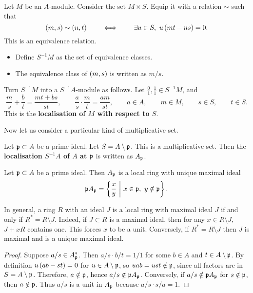 \begin{definition}
Let $ M $ be an $ A $-module. Consider the set $ M \times S $. Equip it with a relation $ \sim $ such that
$$ \br{m, s} \sim \br{n, t} \qquad \iff \qquad \exists u \in S, \ u\br{mt - ns} = 0. $$
This is an equivalence relation.
\begin{itemize}
\item Define $ S^{-1}M $ as the set of equivalence classes.
\item The equivalence class of $ \br{m, s} $ is written as $ m / s $.
\end{itemize}
Turn $ S^{-1}M $ into a $ S^{-1}A $-module as follows. Let $ \tfrac{0}{1}, \tfrac{1}{1} \in S^{-1}M $, and
$$ \dfrac{m}{s} + \dfrac{b}{t} = \dfrac{mt + bs}{st}, \qquad \dfrac{a}{s} \cdot \dfrac{m}{t} = \dfrac{am}{st}, \qquad a \in A, \qquad m \in M, \qquad s \in S, \qquad t \in S. $$
This is the \textbf{localisation of $ M $ with respect to $ S $}.
\end{definition}

\pagebreak

Now let us consider a particular kind of multiplicative set.

\begin{definition}
Let $ \mathfrak{p} \subset A $ be a prime ideal. Let $ S = A \setminus \mathfrak{p} $. This is a multiplicative set. Then the \textbf{localisation $ S^{-1}A $ of $ A $ at $ \mathfrak{p} $} is written as $ A_{\mathfrak{p}} $.
\end{definition}

\begin{theorem}
Let $ \mathfrak{p} \subset A $ be a prime ideal. Then $ A_{\mathfrak{p}} $ is a local ring with unique maximal ideal
$$ \ppp A_\ppp = \cbr{\dfrac{x}{y} \st x \in \ppp, \ y \notin \ppp}. $$
\end{theorem}

\begin{remark*}
In general, a ring $ R $ with an ideal $ J $ is a local ring with maximal ideal $ J $ if and only if $ R^* = R \setminus J $. Indeed, if $ J \subset R $ is a maximal ideal, then for any $ x \in R \setminus J $, $ J + xR $ contains one. This forces $ x $ to be a unit. Conversely, if $ R^* = R \setminus J $ then $ J $ is maximal and is a unique maximal ideal.
\end{remark*}

\begin{proof}
Suppose $ a / s \in A_{\mathfrak{p}}^* $. Then $ a / s \cdot b / t = 1 / 1 $ for some $ b \in A $ and $ t \in A \setminus \mathfrak{p} $. By definition $ u\br{ab - st} = 0 $ for $ u \in A \setminus \mathfrak{p} $, so $ uab = ust \notin \mathfrak{p} $, since all factors are in $ S = A \setminus \mathfrak{p} $. Therefore, $ a \notin \mathfrak{p} $, hence $ a / s \notin \mathfrak{p} A_{\mathfrak{p}} $. Conversely, if $ a / s \notin \mathfrak{p} A_{\mathfrak{p}} $ for $ s \notin \mathfrak{p} $, then $ a \notin \mathfrak{p} $. Thus $ a / s $ is a unit in $ A_{\mathfrak{p}} $ because $ a / s \cdot s / a = 1 $.
\end{proof}

